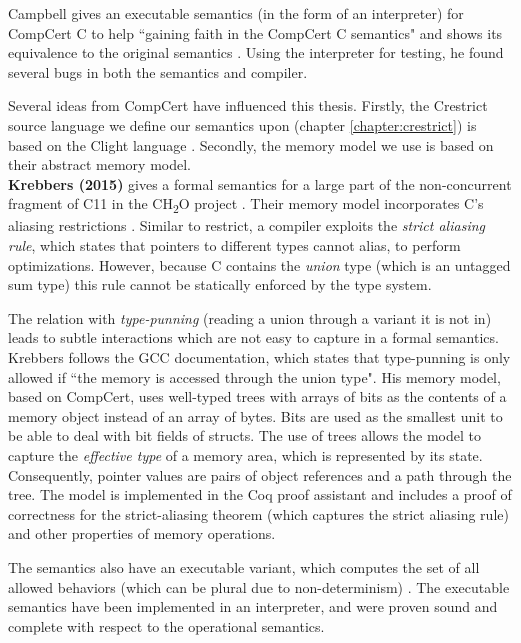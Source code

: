 Campbell gives an executable semantics (in the form of an interpreter) for CompCert C to help ``gaining faith in the CompCert C semantics"
and shows its equivalence to the original semantics \cite{campbell2012executable}.
Using the interpreter for testing, he found several bugs in both the semantics and compiler.  

Several ideas from CompCert have influenced this thesis.
Firstly, the Crestrict source language we define our semantics upon (chapter \ref{chapter:crestrict})
is based on the Clight language \cite{blazy2009mechanized}.
Secondly, the memory model we use is based on their abstract memory model.
\leavevmode
\\

\noindent \textbf{Krebbers (2015)} gives a formal semantics for a large part of the non-concurrent fragment of C11
in the CH\textsubscript{2}O project \cite{krebbers2015c}.
Their memory model incorporates C's aliasing restrictions \cite{krebbers2013aliasing}.
Similar to restrict, a compiler exploits the \textit{strict aliasing rule}, which states that
pointers to different types cannot alias, to perform optimizations. However, because C
contains the \textit{union} type (which is an untagged sum type) this rule cannot be statically enforced by the type system.

The relation with \textit{type-punning} (reading a union through a variant it is not in) leads
to subtle interactions which are not easy to capture in a formal semantics. Krebbers follows the GCC documentation,
which states that type-punning is only allowed if ``the memory is accessed through the union type".
His memory model, based on CompCert, uses well-typed trees with arrays of bits as the contents of a memory object instead of an array of bytes.
Bits are used as the smallest unit to be able to deal with bit fields of structs.
The use of trees allows the model to capture the \textit{effective type} of a memory area, which is represented by its state.
Consequently, pointer values are pairs of object references and a path through the tree.
The model is implemented in the Coq proof assistant and includes a proof of correctness for the
strict-aliasing theorem (which captures the strict aliasing rule) and other properties of memory
operations.

The semantics also have an executable variant, which computes the set of all allowed behaviors (which can
be plural due to non-determinism) \cite{krebbers2015typed}.
The executable semantics have been implemented in an interpreter, and were proven sound and complete with respect to the operational semantics.


